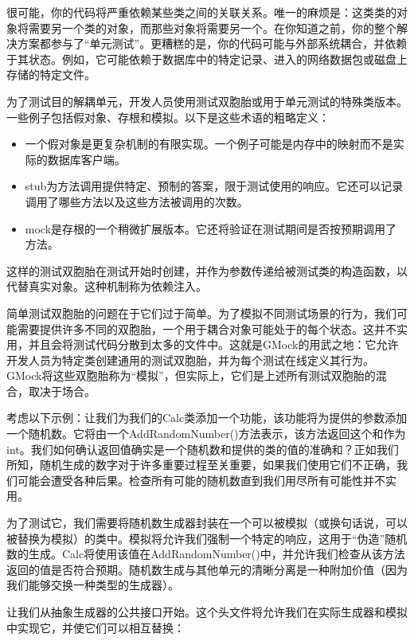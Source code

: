 很可能，你的代码将严重依赖某些类之间的关联关系。唯一的麻烦是：这类类的对象将需要另一个类的对象，而那些对象将需要另一个。在你知道之前，你的整个解决方案都参与了“单元测试”。更糟糕的是，你的代码可能与外部系统耦合，并依赖于其状态。例如，它可能依赖于数据库中的特定记录、进入的网络数据包或磁盘上存储的特定文件。

为了测试目的解耦单元，开发人员使用测试双胞胎或用于单元测试的特殊类版本。一些例子包括假对象、存根和模拟。以下是这些术语的粗略定义：

\begin{itemize}
\item
一个假对象是更复杂机制的有限实现。一个例子可能是内存中的映射而不是实际的数据库客户端。

\item
stub为方法调用提供特定、预制的答案，限于测试使用的响应。它还可以记录调用了哪些方法以及这些方法被调用的次数。

\item
mock是存根的一个稍微扩展版本。它还将验证在测试期间是否按预期调用了方法。
\end{itemize}

这样的测试双胞胎在测试开始时创建，并作为参数传递给被测试类的构造函数，以代替真实对象。这种机制称为依赖注入。

简单测试双胞胎的问题在于它们过于简单。为了模拟不同测试场景的行为，我们可能需要提供许多不同的双胞胎，一个用于耦合对象可能处于的每个状态。这并不实用，并且会将测试代码分散到太多的文件中。这就是GMock的用武之地：它允许开发人员为特定类创建通用的测试双胞胎，并为每个测试在线定义其行为。GMock将这些双胞胎称为“模拟”，但实际上，它们是上述所有测试双胞胎的混合，取决于场合。

考虑以下示例：让我们为我们的Calc类添加一个功能，该功能将为提供的参数添加一个随机数。它将由一个AddRandomNumber()方法表示，该方法返回这个和作为int。我们如何确认返回值确实是一个随机数和提供的类的值的准确和？正如我们所知，随机生成的数字对于许多重要过程至关重要，如果我们使用它们不正确，我们可能会遭受各种后果。检查所有可能的随机数直到我们用尽所有可能性并不实用。

为了测试它，我们需要将随机数生成器封装在一个可以被模拟（或换句话说，可以被替换为模拟）的类中。模拟将允许我们强制一个特定的响应，这用于“伪造”随机数的生成。Calc将使用该值在AddRandomNumber()中，并允许我们检查从该方法返回的值是否符合预期。随机数生成与其他单元的清晰分离是一种附加价值（因为我们能够交换一种类型的生成器）。

让我们从抽象生成器的公共接口开始。这个头文件将允许我们在实际生成器和模拟中实现它，并使它们可以相互替换：

